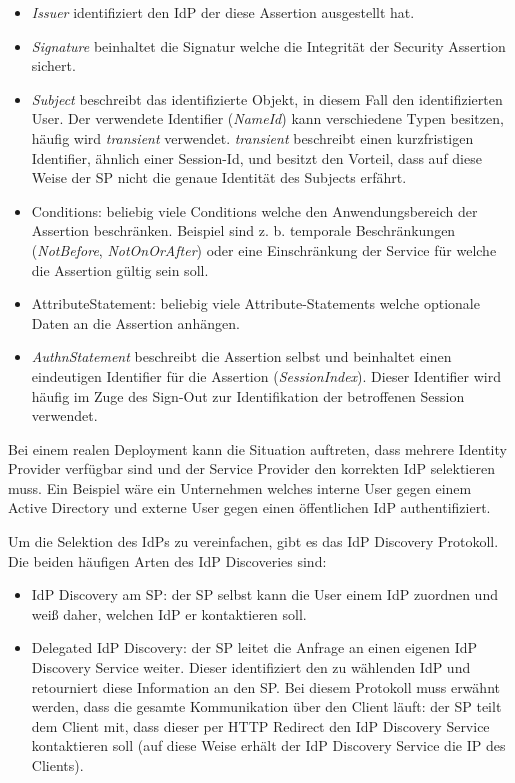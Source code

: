 \begin{itemize}
	\item \textit{Issuer} identifiziert den IdP der diese Assertion ausgestellt hat.
	\item \textit{Signature} beinhaltet die Signatur welche die Integrität der Security Assertion sichert.
	\item \textit{Subject} beschreibt das identifizierte Objekt, in diesem Fall den identifizierten User. Der verwendete Identifier (\textit{NameId}) kann verschiedene Typen besitzen, häufig wird \textit{transient} verwendet. \textit{transient} beschreibt einen kurzfristigen Identifier, ähnlich einer Session-Id, und besitzt den Vorteil, dass auf diese Weise der SP nicht die genaue Identität des Subjects erfährt.
	\item Conditions: beliebig viele Conditions welche den Anwendungsbereich der Assertion beschränken. Beispiel sind z. b. temporale Beschränkungen (\textit{NotBefore}, \textit{NotOnOrAfter}) oder eine Einschränkung der Service für welche die Assertion gültig sein soll.
	\item AttributeStatement: beliebig viele Attribute-Statements welche optionale Daten an die Assertion anhängen.
	\item \textit{AuthnStatement} beschreibt die Assertion selbst und beinhaltet einen eindeutigen Identifier für die Assertion (\textit{SessionIndex}). Dieser Identifier wird häufig im Zuge des Sign-Out zur Identifikation der betroffenen Session verwendet.
\end{itemize}

Bei einem realen Deployment kann die Situation auftreten, dass mehrere Identity Provider verfügbar sind und der Service Provider den korrekten IdP selektieren muss. Ein Beispiel wäre ein Unternehmen welches interne User gegen einem Active Directory und externe User gegen einen öffentlichen IdP authentifiziert.

Um die Selektion des IdPs zu vereinfachen, gibt es das IdP Discovery Protokoll. Die beiden häufigen Arten des IdP Discoveries sind:

\begin{itemize}
	\item IdP Discovery am SP: der SP selbst kann die User einem IdP zuordnen und weiß daher, welchen IdP er kontaktieren soll.
	\item Delegated IdP Discovery: der SP leitet die Anfrage an einen eigenen IdP Discovery Service weiter. Dieser identifiziert den zu wählenden IdP und retourniert diese Information an den SP. Bei diesem Protokoll muss erwähnt werden, dass die gesamte Kommunikation über den Client läuft: der SP teilt dem Client mit, dass dieser per HTTP Redirect den IdP Discovery Service kontaktieren soll (auf diese Weise erhält der IdP Discovery Service die IP des Clients).
\end{itemize}

